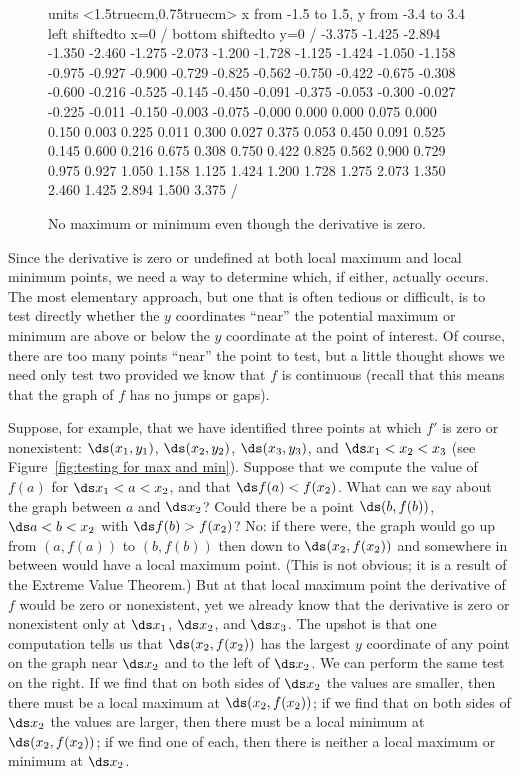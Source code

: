 \begin{figure}[H]
	\centerline{\vbox{\beginpicture
			\normalgraphs
			\setcoordinatesystem units <1.5truecm,0.75truecm>
			\setplotarea x from -1.5 to 1.5, y from -3.4 to 3.4
			\axis left shiftedto x=0 /
			\axis bottom shiftedto y=0 /
			\setquadratic
			 -3.375 -1.425 -2.894 -1.350 -2.460 -1.275 -2.073 -1.200 -1.728 
			-1.125 -1.424 -1.050 -1.158 -0.975 -0.927 -0.900 -0.729 -0.825 -0.562 
			-0.750 -0.422 -0.675 -0.308 -0.600 -0.216 -0.525 -0.145 -0.450 -0.091 
			-0.375 -0.053 -0.300 -0.027 -0.225 -0.011 -0.150 -0.003 -0.075 -0.000 
			0.000 0.000 0.075 0.000 0.150 0.003 0.225 0.011 0.300 0.027 
			0.375 0.053 0.450 0.091 0.525 0.145 0.600 0.216 0.675 0.308 
			0.750 0.422 0.825 0.562 0.900 0.729 0.975 0.927 1.050 1.158 
			1.125 1.424 1.200 1.728 1.275 2.073 1.350 2.460 1.425 2.894 
			1.500 3.375 /
			\endpicture}}
	\caption{No maximum or minimum even though the derivative is zero. \label{fig:non extremum}}
\end{figure}

Since the derivative is zero or undefined at both local maximum and
local minimum points, we need a way to determine which, if either,
actually occurs. The most
elementary approach, but one that is often tedious or difficult, is to
test directly whether the $y$ coordinates ``near'' the potential
maximum or minimum are above or below the $y$ coordinate at the point
of interest. Of course, there are too many points ``near'' the point
to test, but a little thought shows we need only test two provided we
know that $f$ is continuous (recall that this means that the graph of
$f$ has no jumps or gaps).

Suppose, for example, that we have identified three points at which
$f'$ is zero or nonexistent: $\ds (x_1,y_1)$, $\ds (x_2,y_2)$, $\ds (x_3,y_3)$,
and $\ds x_1<x_2<x_3$ (see Figure~\ref{fig:testing for max and
	min}). Suppose that we compute the value of $f(a)$ for $\ds x_1<a<x_2$, and
that $\ds f(a)<f(x_2)$. What can we say about the graph between $a$ and
$\ds x_2$? Could there be a point $\ds (b,f(b))$, $\ds a<b<x_2$ with
$\ds f(b)>f(x_2)$? No: if there were, the graph would go up from
$(a,f(a))$ to $(b,f(b))$ then down to $\ds (x_2,f(x_2))$ and somewhere in
between would have a local maximum point. (This is not obvious; it is
a result of the Extreme Value Theorem.)
But at that local maximum
point the derivative of $f$ would be zero or nonexistent, yet we
already know that the derivative is zero or nonexistent only at $\ds x_1$,
$\ds x_2$, and $\ds x_3$. The upshot is that one computation tells us that
$\ds (x_2,f(x_2))$ has the largest $y$ coordinate of any point on the
graph near $\ds x_2$ and to the left of $\ds x_2$. We can perform the same
test on the right. If we find that on both sides of $\ds x_2$ the values
are smaller, then there must be a local maximum at $\ds (x_2,f(x_2))$; if
we find that on both sides of $\ds x_2$ the values are larger, then there
must be a local minimum at $\ds (x_2,f(x_2))$; if we find one of each,
then there is neither a local maximum or minimum at $\ds x_2$.

